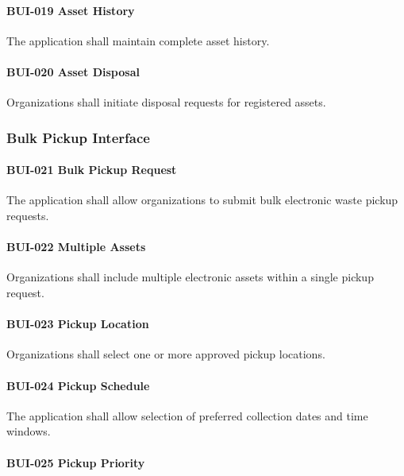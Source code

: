 \paragraph{BUI-019 Asset History}

The application shall maintain complete asset history.

\paragraph{BUI-020 Asset Disposal}

Organizations shall initiate disposal requests for registered assets.


\subsubsection*{Bulk Pickup Interface}

\paragraph{BUI-021 Bulk Pickup Request}

The application shall allow organizations to submit bulk electronic
waste pickup requests.

\paragraph{BUI-022 Multiple Assets}

Organizations shall include multiple electronic assets within a single
pickup request.

\paragraph{BUI-023 Pickup Location}

Organizations shall select one or more approved pickup locations.

\paragraph{BUI-024 Pickup Schedule}

The application shall allow selection of preferred collection dates and
time windows.

\paragraph{BUI-025 Pickup Priority}

